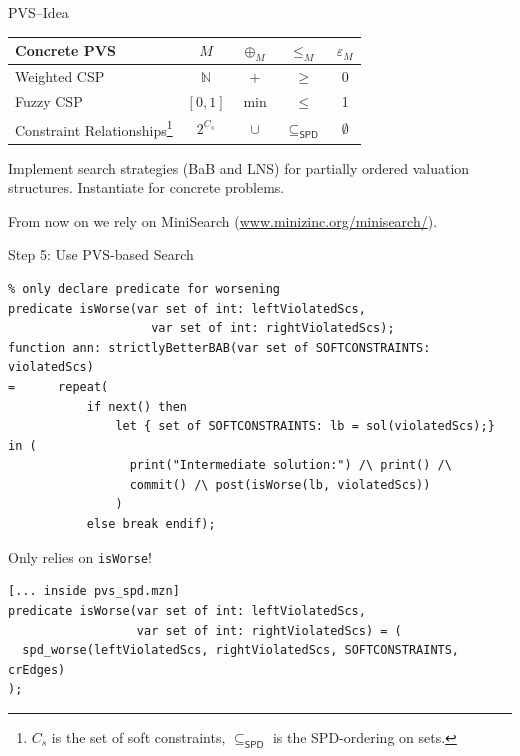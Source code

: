 \documentclass[10pt,xcolor={dvipsnames},fleqn]{beamer}
\begin{document}
\begin{frame}[fragile]{PVS--Idea}
\begin{center}
\begin{tabular}{l|c|c|c|c}
\textbf{Concrete PVS} & $M$ & $\oplus_M$ & $\leq_M$ & $\varepsilon_M$ \\ 
\hline 
Weighted CSP & $\mathbb{N}$ & $+$ & $\geq$ & $0$ \\ 
Fuzzy CSP & $[0,1]$ & $\min$ & $\leq$  & 1 \\ 
Constraint Relationships\footnote{$C_s$ is the set of soft constraints, $\subseteq_{\mathsf{SPD}}$ is the SPD-ordering on sets.} &$2^{C_s}$ & $\cup$ & $\subseteq_{\mathsf{SPD}}$ & $\emptyset$ \\ 
\end{tabular} 
\end{center}

\begin{parchment}
Implement search strategies (BaB and LNS) for partially ordered valuation structures. Instantiate for concrete problems.
\end{parchment}
\alert{From now on we rely on MiniSearch (\url{www.minizinc.org/minisearch/}).}
\end{frame}

\begin{frame}[fragile]{Step 5: Use PVS-based Search}
\begin{lstlisting}
% only declare predicate for worsening
predicate isWorse(var set of int: leftViolatedScs, 
                    var set of int: rightViolatedScs); 
function ann: strictlyBetterBAB(var set of SOFTCONSTRAINTS: violatedScs) 
=      repeat(
           if next() then 
               let { set of SOFTCONSTRAINTS: lb = sol(violatedScs);} in (
                 print("Intermediate solution:") /\ print() /\
                 commit() /\ post(isWorse(lb, violatedScs))
               )
           else break endif);
\end{lstlisting}
\small
Only relies on \texttt{isWorse}!

\begin{lstlisting}
[... inside pvs_spd.mzn]
predicate isWorse(var set of int: leftViolatedScs, 
                  var set of int: rightViolatedScs) = (
  spd_worse(leftViolatedScs, rightViolatedScs, SOFTCONSTRAINTS, crEdges)
);

\end{lstlisting}
\end{frame}
\end{document}
